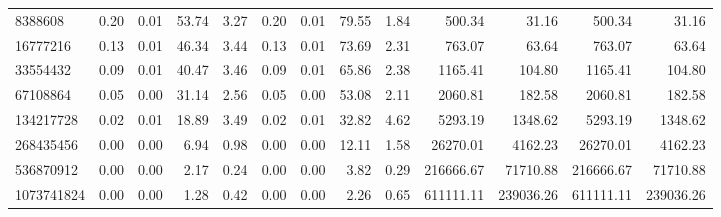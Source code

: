 \begin{tabular}{lrrrrrrrrrrrr}
8388608 & 0.20 & 0.01 & 53.74 & 3.27 & 0.20 & 0.01 & 79.55 & 1.84 & 500.34 & 31.16 & 500.34 & 31.16 \\
16777216 & 0.13 & 0.01 & 46.34 & 3.44 & 0.13 & 0.01 & 73.69 & 2.31 & 763.07 & 63.64 & 763.07 & 63.64 \\
33554432 & 0.09 & 0.01 & 40.47 & 3.46 & 0.09 & 0.01 & 65.86 & 2.38 & 1165.41 & 104.80 & 1165.41 & 104.80 \\
67108864 & 0.05 & 0.00 & 31.14 & 2.56 & 0.05 & 0.00 & 53.08 & 2.11 & 2060.81 & 182.58 & 2060.81 & 182.58 \\
134217728 & 0.02 & 0.01 & 18.89 & 3.49 & 0.02 & 0.01 & 32.82 & 4.62 & 5293.19 & 1348.62 & 5293.19 & 1348.62 \\
268435456 & 0.00 & 0.00 & 6.94 & 0.98 & 0.00 & 0.00 & 12.11 & 1.58 & 26270.01 & 4162.23 & 26270.01 & 4162.23 \\
536870912 & 0.00 & 0.00 & 2.17 & 0.24 & 0.00 & 0.00 & 3.82 & 0.29 & 216666.67 & 71710.88 & 216666.67 & 71710.88 \\
1073741824 & 0.00 & 0.00 & 1.28 & 0.42 & 0.00 & 0.00 & 2.26 & 0.65 & 611111.11 & 239036.26 & 611111.11 & 239036.26 \\
\bottomrule
\end{tabular}
